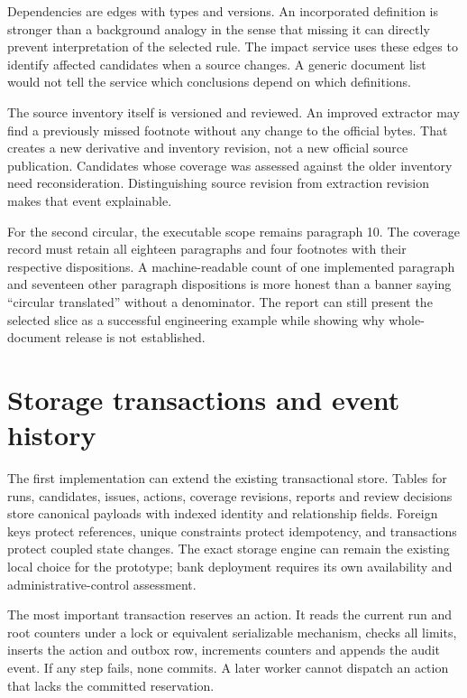 \documentclass[12pt,a4paper,oneside,openany]{book}
\begin{document}
Dependencies are edges with types and versions. An incorporated definition is
stronger than a background analogy in the sense that missing it can directly
prevent interpretation of the selected rule. The impact service uses these edges
to identify affected candidates when a source changes. A generic document list
would not tell the service which conclusions depend on which definitions.

The source inventory itself is versioned and reviewed. An improved extractor may
find a previously missed footnote without any change to the official bytes. That
creates a new derivative and inventory revision, not a new official source
publication. Candidates whose coverage was assessed against the older inventory
need reconsideration. Distinguishing source revision from extraction revision
makes that event explainable.

For the second circular, the executable scope remains paragraph 10. The coverage
record must retain all eighteen paragraphs and four footnotes with their
respective dispositions. A machine-readable count of one implemented paragraph
and seventeen other paragraph dispositions is more honest than a banner saying
``circular translated'' without a denominator. The report can still present the
selected slice as a successful engineering example while showing why whole-
document release is not established.

\section{Storage transactions and event history}
\label{merge:M08:06}


The first implementation can extend the existing transactional store. Tables for
runs, candidates, issues, actions, coverage revisions, reports and review decisions
store canonical payloads with indexed identity and relationship fields. Foreign
keys protect references, unique constraints protect idempotency, and transactions
protect coupled state changes. The exact storage engine can remain the existing
local choice for the prototype; bank deployment requires its own availability and
administrative-control assessment.

The most important transaction reserves an action. It reads the current run and
root counters under a lock or equivalent serializable mechanism, checks all
limits, inserts the action and outbox row, increments counters and appends the
audit event. If any step fails, none commits. A later worker cannot dispatch an
action that lacks the committed reservation.
\end{document}

